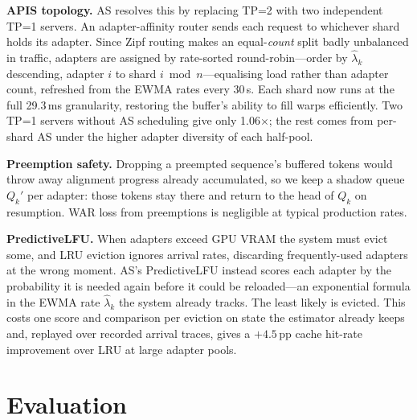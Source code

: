 \documentclass[conference]{IEEEtran}
\newcommand{\asys}{AS\xspace}
\begin{document}
\textbf{APIS topology.}
\asys resolves this by replacing TP=2 with two independent TP=1 servers.
An adapter-affinity router sends each request to whichever shard holds its
adapter.  Since Zipf routing makes an equal-\emph{count} split badly unbalanced
in traffic, adapters are assigned by rate-sorted round-robin---order by $\hat\lambda_k$
descending, adapter $i$ to shard $i \bmod n$---equalising load rather than
adapter count, refreshed from the EWMA rates every 30\,s.
Each shard now runs at the full 29.3\,ms granularity, restoring the buffer's
ability to fill warps efficiently.
Two TP=1 servers without \asys scheduling give only 1.06$\times$; the rest comes
from per-shard \asys under the higher adapter diversity of each half-pool.

\textbf{Preemption safety.}
Dropping a preempted sequence's buffered tokens would throw away alignment
progress already accumulated, so we keep a shadow queue $Q_k'$ per adapter: those
tokens stay there and return to the head of $Q_k$ on resumption.
WAR loss from preemptions is negligible at typical production rates.

\textbf{PredictiveLFU.}
When adapters exceed GPU VRAM the system must evict some, and LRU eviction
ignores arrival rates, discarding frequently-used adapters at the wrong moment.
\asys's PredictiveLFU instead scores each adapter by the probability it is needed
again before it could be reloaded---an exponential formula in the EWMA rate
$\hat\lambda_k$ the system already tracks.  The least likely is evicted.
This costs one score and comparison per eviction on state the estimator already
keeps and, replayed over recorded arrival traces, gives a $+4.5$\,pp cache
hit-rate improvement over LRU at large adapter pools.

\section{Evaluation}
\label{sec:eval}
\end{document}
